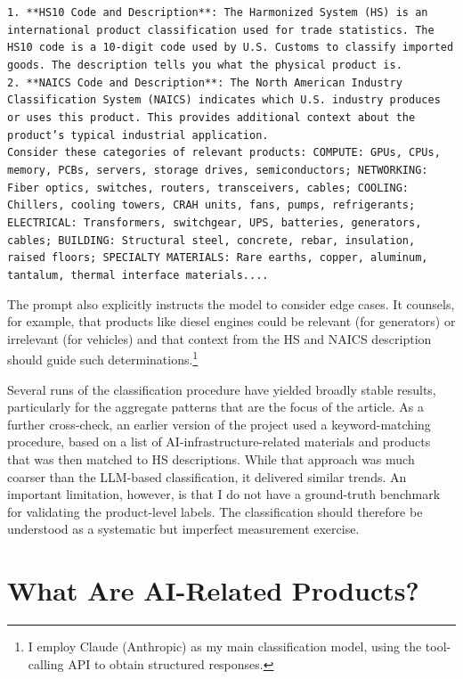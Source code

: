 \documentclass[12pt,pdftex]{article}
\newenvironment{prompt}{\par\medskip\noindent}{\par\medskip}
\begin{document}
\begin{onehalfspacing}
\begin{prompt}
\texttt{1. **HS10 Code and Description**: The Harmonized System (HS) is an international product classification used for trade statistics. The HS10 code is a 10-digit code used by U.S. Customs to classify imported goods. The description tells you what the physical product is.}\\

\texttt{2. **NAICS Code and Description**: The North American Industry Classification System (NAICS) indicates which U.S. industry produces or uses this product. This provides additional context about the product's typical industrial application.}\\

\texttt{Consider these categories of relevant products: COMPUTE: GPUs, CPUs, memory, PCBs, servers, storage drives, semiconductors; NETWORKING: Fiber optics, switches, routers, transceivers, cables; COOLING: Chillers, cooling towers, CRAH units, fans, pumps, refrigerants; ELECTRICAL: Transformers, switchgear, UPS, batteries, generators, cables; BUILDING: Structural steel, concrete, rebar, insulation, raised floors; SPECIALTY MATERIALS: Rare earths, copper, aluminum, tantalum, thermal interface materials....}
\end{prompt}
The prompt also explicitly instructs the model to consider edge cases. It counsels, for example, that products like diesel engines could be relevant (for generators) or irrelevant (for vehicles) and that context from the HS and NAICS description should guide such determinations.\footnote{I employ Claude (Anthropic) as my main classification model, using the tool-calling API to obtain structured responses.}

Several runs of the classification procedure have yielded broadly stable results, particularly for the aggregate patterns that are the focus of the article. As a further cross-check, an earlier version of the project used a keyword-matching procedure, based on a list of AI-infrastructure-related materials and products that was then matched to HS descriptions. While that approach was much coarser than the LLM-based classification, it delivered similar trends. An important limitation, however, is that I do not have a ground-truth benchmark for validating the product-level labels. The classification should therefore be understood as a systematic but imperfect measurement exercise.

\afterpage{%
\clearpage

}

\section*{What Are AI-Related Products?}\label{sec:what-are-ai-products}


\end{onehalfspacing}
\end{document}
